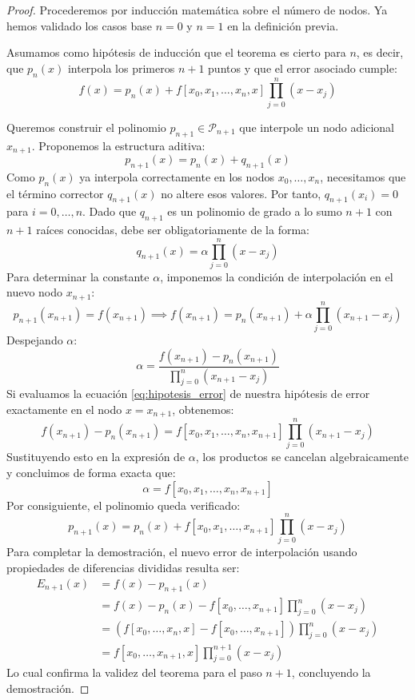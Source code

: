 \begin{proof}
    Procederemos por inducción matemática sobre el número de nodos. Ya hemos validado los casos base $n=0$ y $n=1$ en la definición previa.
    
    Asumamos como hipótesis de inducción que el teorema es cierto para $n$, es decir, que $p_n(x)$ interpola los primeros $n+1$ puntos y que el error asociado cumple:
    \begin{equation}
        f(x) = p_n(x) + f[x_0, x_1, \ldots, x_n, x] \prod_{j=0}^{n} (x - x_j) \label{eq:hipotesis_error}
    \end{equation}
    
    Queremos construir el polinomio $p_{n+1} \in \mathcal{P}_{n+1}$ que interpole un nodo adicional $x_{n+1}$. Proponemos la estructura aditiva:
    \[
        p_{n+1}(x) = p_n(x) + q_{n+1}(x)
    \]
    Como $p_n(x)$ ya interpola correctamente en los nodos $x_0, \dots, x_n$, necesitamos que el término corrector $q_{n+1}(x)$ no altere esos valores. Por tanto, $q_{n+1}(x_i) = 0$ para $i=0, \dots, n$. Dado que $q_{n+1}$ es un polinomio de grado a lo sumo $n+1$ con $n+1$ raíces conocidas, debe ser obligatoriamente de la forma:
    \[
        q_{n+1}(x) = \alpha \prod_{j=0}^n (x - x_j)
    \]
    Para determinar la constante $\alpha$, imponemos la condición de interpolación en el nuevo nodo $x_{n+1}$:
    \[
        p_{n+1}(x_{n+1}) = f(x_{n+1}) \implies f(x_{n+1}) = p_n(x_{n+1}) + \alpha \prod_{j=0}^n (x_{n+1} - x_j)
    \]
    Despejando $\alpha$:
    \[
        \alpha = \frac{f(x_{n+1}) - p_n(x_{n+1})}{\prod_{j=0}^n (x_{n+1} - x_j)}
    \]
    Si evaluamos la ecuación \eqref{eq:hipotesis_error} de nuestra hipótesis de error exactamente en el nodo $x = x_{n+1}$, obtenemos:
    \[
        f(x_{n+1}) - p_n(x_{n+1}) = f[x_0, x_1, \ldots, x_n, x_{n+1}] \prod_{j=0}^{n} (x_{n+1} - x_j)
    \]
    Sustituyendo esto en la expresión de $\alpha$, los productos se cancelan algebraicamente y concluimos de forma exacta que:
    \[
        \alpha = f[x_0, x_1, \ldots, x_n, x_{n+1}]
    \]
    Por consiguiente, el polinomio queda verificado:
    \[
        p_{n+1}(x) = p_n(x) + f[x_0, x_1, \ldots, x_{n+1}] \prod_{j=0}^n (x - x_j)
    \]
    Para completar la demostración, el nuevo error de interpolación usando propiedades de diferencias divididas resulta ser:
    \begin{align*}
        E_{n+1}(x) &= f(x) - p_{n+1}(x) \\
        &= f(x) - p_n(x) - f[x_0, \ldots, x_{n+1}] \prod_{j=0}^n (x - x_j) \\
        &= \left( f[x_0, \ldots, x_n, x] - f[x_0, \ldots, x_{n+1}] \right) \prod_{j=0}^n (x - x_j) \\
        &= f[x_0, \ldots, x_{n+1}, x] \prod_{j=0}^{n+1} (x - x_j)
    \end{align*}
    Lo cual confirma la validez del teorema para el paso $n+1$, concluyendo la demostración.
\end{proof}
